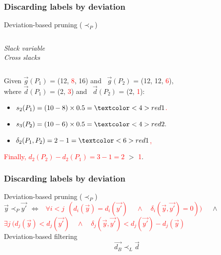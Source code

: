 \begin{frame}
\frametitle{Discarding labels by deviation}
	Deviation-based pruning ($\prec_P$)
	\vspace{5mm}
	\begin{columns}[onlytextwidth, t]
	\textit{Slack variable} \\
	\vspace{1mm}	
	\textit{Cross slacks} \\
	\vspace{1mm}	
	\end{columns}
	\vspace{3mm}
	\begin{example}
		\vspace{1mm}
		Given $\vec g(P_1)$ = (12, \textcolor<2>{red}{8}, 16) and \ $\vec g(P_2)$ = (12, 12, \textcolor<3>{red}{6}),\\
		where $\vec d(P_1)$ = (2, \textcolor<5>{red}{3}) and \ $\vec d(P_2)$ = (2, \textcolor<5>{red}{1}):
		\begin{itemize}
			\item \textcolor<2>{red}{$s_2(P_1) = (10 - 8) \times 0.5 = \textcolor<4>{red}{1}$.} 
			\item \textcolor<3>{red}{$s_3(P_2) = (10 - 6) \times 0.5 = \textcolor<4>{red}{2}.$} 
			\item \textcolor<4>{red}{$\delta_2(P_1, P_2)= 2 - 1 = \textcolor<6>{red}{1}$,} 
		\end{itemize}
		\textcolor<5>{red}{Finally, $d_2(P_2) - d_2(P_1) = 3 - 1 = 2$} $>$ \textcolor<6>{red}{1}.
		\vspace{1mm}		
	\end{example}
\note{}
\end{frame}
\begin{frame}
\frametitle{Discarding labels by deviation}
Deviation-based pruning ($\prec_P$) \\
	\vspace{3mm}
     $ \vec{y} \prec_{P} \vec{y'} \ \ \Leftrightarrow \ \ $ \textcolor<2>{red}{$\forall i < j
      \ \ (d_i(\vec{y}) = d_i(\vec{y'}) \ \quad \land \quad \delta_i(\vec{y}, \vec{y'}) = 0))$} $\quad \land$ \\
     \vspace{3mm}
     \qquad \qquad \qquad \qquad \textcolor<3>{red}{$\exists j \ (d_j(\vec{y}) < d_j(\vec{y'}) \quad \land \quad \delta_j(\vec{y}, \vec {y'}) < d_j(\vec{y'}) - d_j(\vec{y})$} \\
	\vspace{5mm}
	Deviation-based filtering
	\vspace{3mm}
	\begin{equation*}
     \vec{d_B} \prec_{L} \vec{d}
    \end{equation*}
\end{frame}
